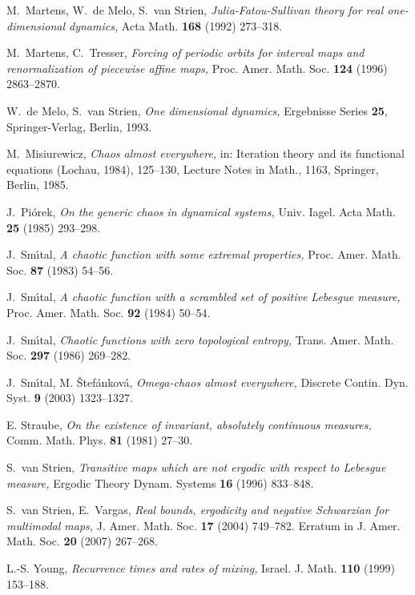 \documentclass[12pt, psamsfonts, reqno]{amsart}
\begin{document}
\begin{thebibliography}{BKNS}
 M.\ Martens, W.\ de Melo, S.\ van Strien, {\em
Julia-Fatou-Sullivan theory for real one-dimensional dynamics,}
Acta Math. {\bf 168} (1992) 273--318.

 M.\ Martens, C.\ Tresser, {\em Forcing of
periodic orbits for interval maps and renormalization of piecewise
affine maps,} Proc. Amer. Math. Soc. {\bf 124} (1996) 2863--2870.

 W.\ de Melo, S.\ van Strien,
{\em One dimensional dynamics,} Ergebnisse Series {\bf 25},
Springer-Verlag, Berlin, 1993.

 M.\ Misiurewicz, {\it Chaos almost everywhere,} in: Iteration
theory and its functional equations (Lochau, 1984), 125--130,
Lecture Notes in Math., 1163, Springer, Berlin, 1985.

 J.\ Pi\'orek, {\em On the generic chaos in
dynamical systems,}  Univ. Iagel. Acta Math. {\bf 25} (1985)
293--298.

 J.\ Sm\'{\i}tal,
{\em A chaotic function with some extremal properties,} Proc.
Amer. Math. Soc. {\bf 87} (1983) 54--56.

 J.\ Sm\'{\i}tal, {\em A chaotic function with a
scrambled set of positive Lebesgue measure,} Proc. Amer. Math.
Soc. {\bf 92} (1984) 50--54.

 J.\ Sm\'{\i}tal, {\em Chaotic functions with zero topological
entropy,} Trans. Amer. Math. Soc.  {\bf 297}  (1986) 269--282.

 J.\ Sm\'{\i}tal, M. \v{S}tef\'ankov\'a, {\em Omega-chaos almost
everywhere,} Discrete Contin. Dyn. Syst.  {\bf 9}  (2003)
1323--1327.

 E. Straube,
{\em On the existence of invariant, absolutely continuous
measures,} Comm. Math. Phys. {\bf 81} (1981) 27--30.

 S.\ van Strien,
{\em Transitive maps which are not ergodic with respect to
Lebesgue measure,} Ergodic Theory Dynam. Systems {\bf 16} (1996)
833--848.

 S.\ van Strien, E.\ Vargas,
{\em Real bounds, ergodicity and negative Schwarzian for
multimodal maps,}  J. Amer. Math. Soc.  {\bf 17}  (2004) 749--782.
Erratum in  J. Amer. Math. Soc.  {\bf 20}  (2007) 267--268.

  L.-S. Young,
{\em Recurrence times and rates of mixing,} Israel. J. Math. {\bf
110} (1999) 153--188.

\end{thebibliography}
\end{document}
